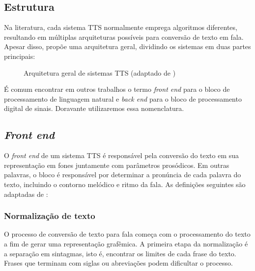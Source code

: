 \subsection{Estrutura}
Na literatura, cada sistema TTS normalmente emprega algoritmos diferentes,
resultando em múltiplas arquiteturas possíveis para conversão de texto em fala.
Apesar disso,  propõe uma arquitetura geral, dividindo os
sistemas em duas partes principais:

\begin{figure}[!htbp]
\centering
{}
\caption{Arquitetura geral de sistemas TTS (adaptado de )}
\label{fig:tts-arch}
\end{figure}

É comum encontrar em outros trabalhos o termo \emph{front end} para o
bloco de processamento de linguagem natural e \emph{back end} para o bloco de
processamento digital de sinais. Doravante utilizaremos essa nomenclatura.

\subsection{\emph{Front end}}
O \emph{front end} de um sistema TTS é responsável pela conversão do texto em
sua representação em fones juntamente com parâmetros prosódicos. Em outras
palavras, o bloco é responsável por determinar a pronúncia de cada palavra do
texto, incluindo o contorno melódico e ritmo da fala. As definições seguintes
são adaptadas de \cite{martinjurafsky}:

\subsubsection{Normalização de texto}
O processo de conversão de texto para fala começa com o processamento do texto a
fim de gerar uma representação grafêmica. A primeira etapa da normalização é a
separação em sintagmas, isto é, encontrar os limites de cada frase do texto.
Frases que terminam com siglas ou abreviações podem dificultar o processo.

